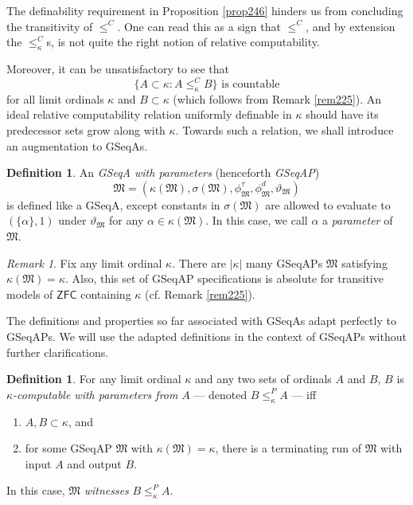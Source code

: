 \documentclass[12pt, twoside]{memoir}
\numberwithin{equation}{section}
\theoremstyle{definition}
\newtheorem{defi}[thm]{Definition}
\theoremstyle{remark}
\newtheorem{rem}[thm]{Remark}
\theoremstyle{definition}
\theoremstyle{definition}
\theoremstyle{definition}
\theoremstyle{remark}
\begin{document}
The definability requirement in Proposition \ref{prop246} hinders us from concluding the transitivity of $\leq^C$. One can read this as a sign that $\leq^C$, and by extension the $\leq^C_{\kappa}$s, is not quite the right notion of relative computability.

Moreover, it can be unsatisfactory to see that
\begin{equation*}
    \{A \subset \kappa : A \leq^C_{\kappa} B\} \text{ is countable}
\end{equation*}
for all limit ordinals $\kappa$ and $B \subset \kappa$ (which follows from Remark \ref{rem225}). An ideal relative computability relation uniformly definable in $\kappa$ should have its predecessor sets grow along with $\kappa$. Towards such a relation, we shall introduce an augmentation to GSeqAs.

\begin{defi}\label{def836}
An \emph{GSeqA with parameters} (henceforth \emph{GSeqAP}) 
\begin{equation*}
    \mathfrak{M} = (\kappa(\mathfrak{M}), \sigma(\mathfrak{M}), \phi^{\tau}_{\mathfrak{M}}, \phi^d_{\mathfrak{M}}, \vartheta_{\mathfrak{M}})
\end{equation*} 
is defined like a GSeqA, except constants in $\sigma(\mathfrak{M})$ are allowed to evaluate to $(\{\alpha\}, 1)$ under $\vartheta_{\mathfrak{M}}$ for any $\alpha \in \kappa(\mathfrak{M})$. In this case, we call $\alpha$ a \emph{parameter} of $\mathfrak{M}$.
\end{defi}

\begin{rem}\label{rem248}
Fix any limit ordinal $\kappa$. There are $|\kappa|$ many GSeqAPs $\mathfrak{M}$ satisfying $\kappa(\mathfrak{M}) = \kappa$. Also, this set of GSeqAP specifications is absolute for transitive models of $\mathsf{ZFC}$ containing $\kappa$ (cf. Remark \ref{rem225}).
\end{rem}

The definitions and properties so far associated with GSeqAs adapt perfectly to GSeqAPs. We will use the adapted definitions in the context of GSeqAPs without further clarifications.

\begin{defi}\label{def38}
For any limit ordinal $\kappa$ and any two sets of ordinals $A$ and $B$, $B$ is $\kappa$\emph{-computable with parameters from} $A$ --- denoted $B \leq^P_{\kappa} A$ --- iff 
\begin{enumerate}[label=(\alph*)]
    \item $A, B \subset \kappa$, and
    \item for some GSeqAP $\mathfrak{M}$ with $\kappa(\mathfrak{M}) = \kappa$, there is a terminating run of $\mathfrak{M}$ with input $A$ and output $B$. 
\end{enumerate}
In this case, $\mathfrak{M}$ \emph{witnesses} $B \leq^P_{\kappa} A$.
\end{defi}
\end{document}
